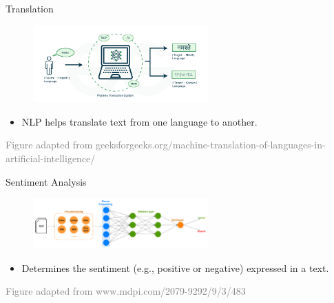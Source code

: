 \documentclass[serif, aspectratio=169]{beamer}
\begin{document}
\begin{frame}{Translation}
	\begin{figure}
		\centering
		\includegraphics[width=0.6\textwidth]{pic/translation_image.png}
	\end{figure}
	\begin{itemize}
		\item NLP helps translate text from one language to another.
	\end{itemize}
	\vspace{1.6cm}
	\hspace{-1.0cm}
	{\tiny \textcolor{gray}{Figure adapted from geeksforgeeks.org/machine-translation-of-languages-in-artificial-intelligence/}}
\end{frame}

\begin{frame}{Sentiment Analysis}
	\begin{figure}
		\centering
		\includegraphics[width=0.6\textwidth]{pic/5.png}
	\end{figure}
	\begin{itemize}
		\item Determines the sentiment (e.g., positive or negative) expressed in a text.
	\end{itemize}
	\vspace{2.6cm}
	\hspace{-1.0cm}
	{\tiny \textcolor{gray}{Figure adapted from www.mdpi.com/2079-9292/9/3/483}}
\end{frame}
\end{document}
